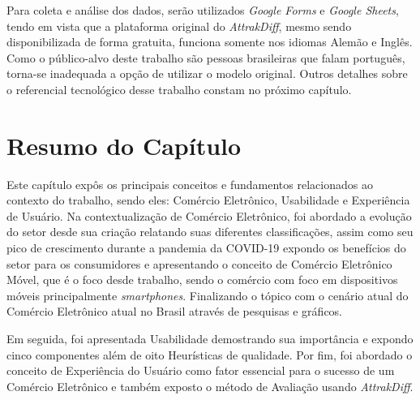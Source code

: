 Para coleta e análise dos dados, serão utilizados \textit{Google Forms} e \textit{Google Sheets}, tendo em vista que a plataforma original do \textit{AttrakDiff}, mesmo sendo disponibilizada de forma gratuita, funciona somente nos idiomas Alemão e Inglês. Como o público-alvo deste trabalho são pessoas brasileiras que falam português, torna-se inadequada a opção de utilizar o modelo original. Outros detalhes sobre o referencial tecnológico desse trabalho constam no próximo capítulo.

\section{Resumo do Capítulo} 
\label{resteo}

Este capítulo expôs os principais conceitos e fundamentos relacionados ao contexto do trabalho, sendo eles: Comércio Eletrônico, Usabilidade e Experiência de Usuário.
Na contextualização de Comércio Eletrônico, foi abordado a evolução do setor desde sua criação relatando suas diferentes classificações, assim como seu pico de crescimento durante a pandemia da COVID-19 expondo os benefícios do setor para os consumidores e apresentando o conceito de Comércio Eletrônico Móvel, que é o foco desde trabalho, sendo o comércio com foco em dispositivos móveis principalmente \textit{smartphones}. Finalizando o tópico com o cenário atual do Comércio Eletrônico atual no Brasil através de pesquisas e gráficos.

Em seguida, foi apresentada Usabilidade demostrando sua importância e expondo cinco componentes além de oito Heurísticas de qualidade. Por fim, foi abordado o conceito de Experiência do Usuário como fator essencial para o sucesso de um Comércio Eletrônico e também exposto o método de Avaliação usando \textit{AttrakDiff}.




